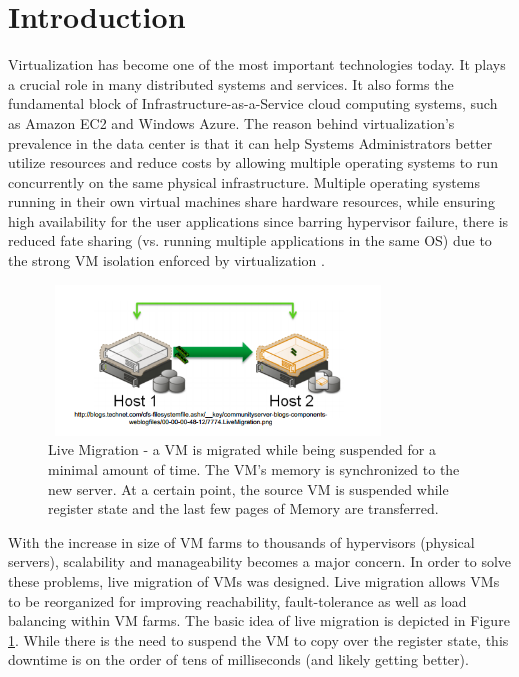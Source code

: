 \documentclass{acm_proc_article-sp}
\begin{document}
\setlength{\parindent}{0.5cm}
\section{Introduction}
Virtualization has become one of the most important technologies today. It plays a crucial role in many distributed systems and services. It also forms the fundamental block of Infrastructure-as-a-Service cloud computing systems, such as Amazon EC2 \cite{ec2} and Windows Azure\cite{azure}. The reason behind virtualization's prevalence in the data center is that it can help Systems Administrators better utilize resources and reduce costs by allowing multiple operating systems to run concurrently on the same physical infrastructure.  Multiple operating systems running in their own virtual machines share hardware resources, while ensuring high availability for the user applications since barring hypervisor failure, there is reduced fate sharing (vs. running multiple applications in the same OS) due to the strong VM isolation enforced by virtualization \cite{virt_app}.
\par
\begin{figure}[ht]
\centering
        \includegraphics[height=4cm,width=9cm]{images/live_migration.png}
    \caption{Live Migration - a VM is migrated while being suspended for a minimal amount of time.  The VM's memory is synchronized to the new server.  At a certain point, the source VM is suspended while register state and the last few pages of Memory are transferred.} 
    \label{fig:live_migration}
\end{figure}

With the increase in size of VM farms to thousands of hypervisors (physical servers), scalability and manageability becomes a major concern. In order to solve these problems, live migration of VMs was designed. Live migration allows VMs to be reorganized for improving reachability, fault-tolerance as well as load balancing within VM farms. The basic idea of live migration is depicted in Figure \ref{fig:live_migration}.  While there is the need to suspend the VM to copy over the register state, this downtime is on the order of tens of milliseconds (and likely getting better)\cite{live_migration}.
\end{document}
